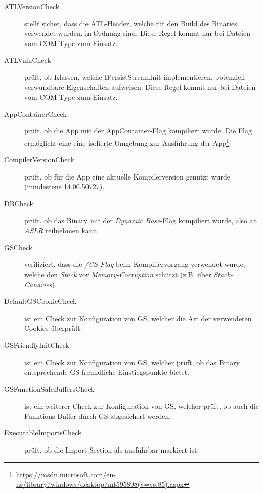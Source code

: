 
\begin{description}
	\item[ATLVersionCheck] stellt sicher, dass die ATL-Header, welche für den Build des Binaries verwendet wurden, in Ordnung sind. Diese Regel kommt nur bei Dateien vom COM-Type zum Einsatz.
	
	\item[ATLVulnCheck] prüft, ob Klassen, welche IPersistStreamInit implementieren, potenziell verwundbare Eigenschaften aufweisen. Diese Regel kommt nur bei Dateien vom COM-Type zum Einsatz.
	
	\item[AppContainerCheck] prüft, ob die App mit der AppContainer-Flag kompiliert wurde. Die Flag ermöglicht eine eine isolierte Umgebung zur Ausführung der App\footnote{\url{https://msdn.microsoft.com/en-us/library/windows/desktop/mt595898(v=vs.85).aspx}}.
	
	\item[CompilerVersionCheck] prüft, ob für die App eine aktuelle Kompilerversion genutzt wurde (mindestens 14.00.50727).
	
	\item[DBCheck] prüft, ob das Binary mit der \textit{Dynamic Base}-Flag kompiliert wurde, also an \textit{ASLR} teilnehmen kann.
	
	\item[GSCheck] verifiziert, dass die \textit{/GS-Flag} beim Kompiliervorgang verwendet wurde, welche den \textit{Stack} vor \textit{Memory-Corruption} schützt (z.B. über \textit{Stack-Canaries}). 
	
	\item[DefaultGSCookieCheck] ist ein Check zur Konfiguration von GS, welcher die Art der verwendeten Cookies überprüft.
	
	\item[GSFriendlyInitCheck] ist ein Check zur Konfiguration von GS, welcher prüft, ob das Binary entsprechende GS-freundliche Einstiegspunkte bietet.
	
	\item[GSFunctionSafeBuffersCheck] ist ein weiterer Check zur Konfiguration von GS, welcher prüft, ob auch die Funktions-Buffer durch GS abgesichert werden.
	
	\item[ExecutableImportsCheck] prüft, ob die Import-Section als ausführbar markiert ist.
	

\end{description}
